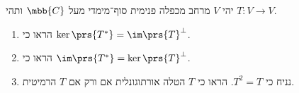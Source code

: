 \documentclass[a4paper,10pt,twoside,openany]{article}
\begin{document}
\begin{exercise}
יהי
$V$
מרחב מכפלה פנימית סוף־מימדי מעל
$\mbb{C}$
ותהי
$T \colon V \to V$.

\begin{enumerate}
\item הראו כי
$\ker\prs{T^*} = \im\prs{T}^\perp$.
\item הראו כי
$\im\prs{T^*} = \ker\prs{T}^\perp$.
\item
נניח כי
$T^2 = T$.
הראו כי
$T$
הטלה אורתוגונלית אם ורק אם
$T$
הרמיטית.
\end{enumerate}
\end{exercise}
\end{document}
